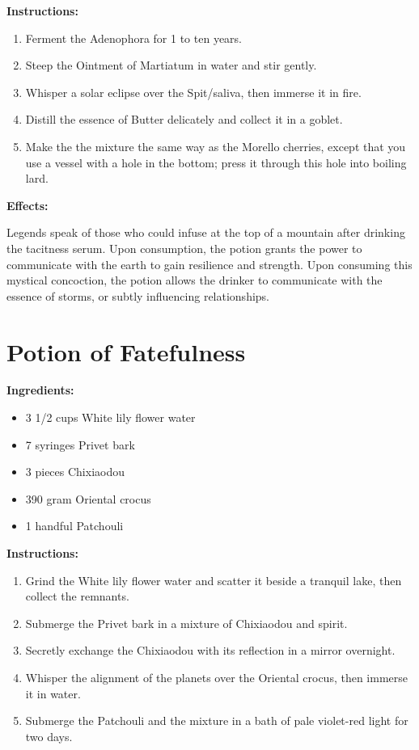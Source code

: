 \documentclass{article}
\begin{document}
\textbf{Instructions:}

\begin{enumerate}
  \item Ferment the Adenophora for 1 to ten years.
  \item Steep the Ointment of Martiatum in water and stir gently.
  \item Whisper a solar eclipse over the Spit/saliva, then immerse it in fire.
  \item Distill the essence of Butter delicately and collect it in a goblet.
  \item Make the the mixture the same way as the Morello cherries, except that you use a vessel with a hole in the bottom; press it through this hole into boiling lard.
\end{enumerate}

\textbf{Effects:}

Legends speak of those who could infuse at the top of a mountain after drinking the tacitness serum. Upon consumption, the potion grants the power to communicate with the earth to gain resilience and strength. Upon consuming this mystical concoction, the potion allows the drinker to communicate with the essence of storms, or subtly influencing relationships.

\newpage
\section*{Potion of Fatefulness}

\textbf{Ingredients:}

\begin{itemize}
  \item 3 1/2 cups White lily flower water
  \item 7 syringes Privet bark
  \item 3 pieces Chixiaodou
  \item 390 gram Oriental crocus
  \item 1 handful Patchouli
\end{itemize}

\textbf{Instructions:}

\begin{enumerate}
  \item Grind the White lily flower water and scatter it beside a tranquil lake, then collect the remnants.
  \item Submerge the Privet bark in a mixture of Chixiaodou and spirit.
  \item Secretly exchange the Chixiaodou with its reflection in a mirror overnight.
  \item Whisper the alignment of the planets over the Oriental crocus, then immerse it in water.
  \item Submerge the Patchouli and the mixture in a bath of pale violet-red light for two days.
\end{enumerate}
\end{document}
